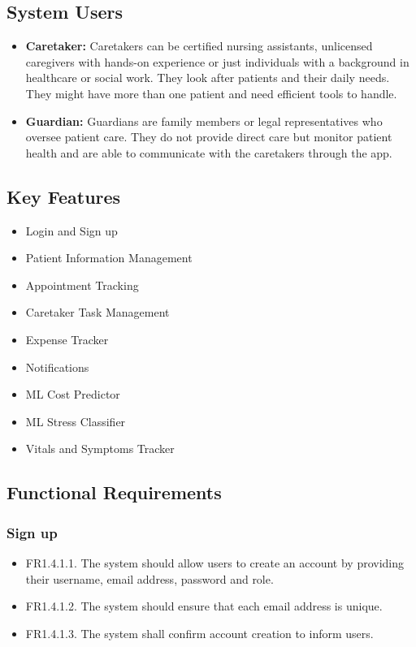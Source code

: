 \documentclass[12pt,a4paper]{article}
\begin{document}
\subsection{System Users}

\begin{itemize}
    \item \textbf{Caretaker:} 
    Caretakers can be certified nursing assistants, unlicensed caregivers with hands-on
experience or just individuals with a background in healthcare or social work.
They look after patients and their daily needs. They might have more than one patient
and need efficient tools to handle.
    \item \textbf{Guardian:} 
    Guardians are family members or legal representatives who oversee patient care.
They do not provide direct care but monitor patient health and are able to
communicate with the caretakers through the app.
\end{itemize}

\subsection{Key Features}

\begin{itemize}
    \item Login and Sign up
    \item Patient Information Management
    \item Appointment Tracking
    \item Caretaker Task Management
    \item Expense Tracker
    \item Notifications
    \item ML Cost Predictor
    \item ML Stress Classifier
    \item Vitals and Symptoms Tracker
\end{itemize}


\subsection{Functional Requirements}

\subsubsection{Sign up}
\begin{itemize}
    \item FR1.4.1.1. The system should allow users to create an account by providing their username, email address, password and role.
    \item FR1.4.1.2. The system should ensure that each email address is unique.
    \item FR1.4.1.3. The system shall confirm account creation to inform users.
\end{itemize}
\end{document}
